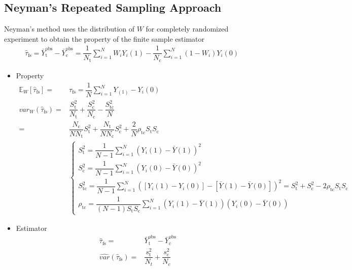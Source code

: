     
\subsection{Neyman's Repeated Sampling Approach}

Neyman's method uses the distribution of $ W $ for completely randomized experiment to obtain the property of the finite sample estimator
\begin{align}
    \hat{\tau}_\mathrm{fs}=\bar{Y}_\mathrm{t}^\mathrm{obs}-\bar{Y}_\mathrm{c}^\mathrm{obs}= \dfrac{1}{N_\mathrm{t} }\sum_{i=1}^N W_iY_i(1)-\dfrac{1}{N_\mathrm{c} } \sum_{i=1}^N(1-W_i)Y_i(0)   
\end{align}

\begin{itemize}[topsep=2pt,itemsep=0pt]
    \item Property
    \begin{align}
        \mathbb{E}_W\left[ \hat{\tau}_\mathrm{fs}  \right] = & \tau_\mathrm{fs}=\dfrac{1}{N}\sum_{i=1}^NY_(1)-Y_i(0) \\
        var_W(\hat{\tau}_\mathrm{fs} )=&\dfrac{S_\mathrm{t} ^2}{N_\mathrm{t} }+\dfrac{S_\mathrm{c} ^2}{N_\mathrm{c} }-\dfrac{S^2_{\mathrm{tc} }}{N}\\
        =&\dfrac{N_\mathrm{c} }{NN_\mathrm{t} }S_\mathrm{t} ^2+\dfrac{N_\mathrm{t} }{NN_\mathrm{c} }S_\mathrm{c}^2+\dfrac{2}{N}\rho _{\mathrm{tc} }S_\mathrm{t}S_\mathrm{c}    \\
        &\begin{cases}
            S_\mathrm{t}^2=\dfrac{1}{N-1}\sum_{i=1}^N(Y_i(1)-\bar{Y}(1))^2\\
            S_\mathrm{c}^2=\dfrac{1}{N-1}\sum_{i=1}^N(Y_i(0)-\bar{Y}(0))^2\\
            S_\mathrm{tc}^2=\dfrac{1}{N-1}\sum_{i=1}^N\left([Y_i(1)-Y_i(0)]-[\bar{Y}(1)-\bar{Y}(0)]\right)^2=S_\mathrm{t}^2+S_\mathrm{c}^2-2\rho _\mathrm{tc}S_\mathrm{t}S_{\mathrm{c} }    \\
            \rho _\mathrm{tc}=\dfrac{1}{(N-1)S_\mathrm{t}S_{\mathrm{c} } }\sum_{i=1}^N\left(Y_i(1)-\bar{Y}(1)\right)\left(Y_i(0)-\bar{Y}(0)\right) 
        \end{cases}
    \end{align}
    \item Estimator
    \begin{align}
        \hat{\tau}_\mathrm{fs}= & \bar{Y}_\mathrm{t}^\mathrm{obs}-\bar{Y}_\mathrm{c}^\mathrm{obs}\\
        \hat{var}(\hat{\tau}_\mathrm{fs} )=&\dfrac{s^2_\mathrm{t} }{N_t}+\dfrac{s^2_\mathrm{c} }{N_c}\\

\end{align}
\end{itemize}

